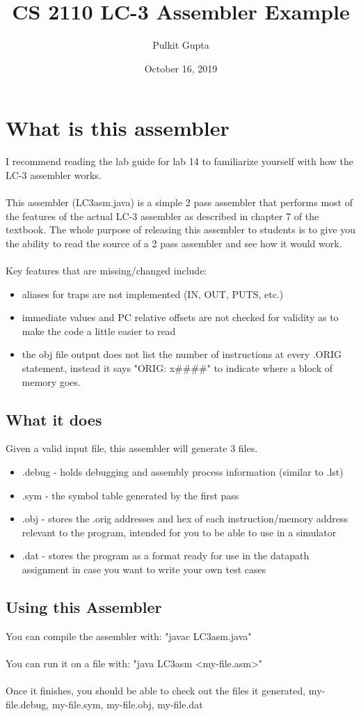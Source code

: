 \documentclass{article}
\title{CS 2110 LC-3 Assembler Example}
\author{Pulkit Gupta}
\date{October 16, 2019}
\begin{document}
\maketitle

\tableofcontents
\section{What is this assembler}
I recommend reading the lab guide for lab 14 to familiarize yourself with how the LC-3 assembler works.
\\\\
This assembler (LC3asm.java) is a simple 2 pass assembler that performs most of the features of the actual LC-3 assembler as described in chapter 7 of the textbook. The whole purpose of releasing this assembler to students is to give you the ability to read the source of a 2 pass assembler and see how it would work.
\\\\
Key features that are missing/changed include:
\begin{itemize}
    \item aliases for traps are not implemented (IN, OUT, PUTS, etc.)
    \item immediate values and PC relative offsets are not checked for validity as to make the code a little easier to read
    \item the obj file output does not list the number of instructions at every .ORIG statement, instead it says "ORIG: x\#\#\#\#" to indicate where a block of memory goes.
\end{itemize}

\subsection{What it does}
Given a valid input file, this assembler will generate 3 files.
\begin{itemize}
    \item .debug - holds debugging and assembly process information (similar to .lst)
    \item .sym - the symbol table generated by the first pass
    \item .obj - stores the .orig addresses and hex of each instruction/memory address relevant to the program, intended for you to be able to use in a simulator
    \item .dat - stores the program as a format ready for use in the datapath assignment in case you want to write your own test cases
\end{itemize}

\subsection{Using this Assembler}
You can compile the assembler with: "javac LC3asm.java"
\\\\
You can run it on a file with: "java LC3asm \textless my-file.asm\textgreater"
\\\\
Once it finishes, you should be able to check out the files it generated, my-file.debug, my-file.sym, my-file.obj, my-file.dat
\end{document}
